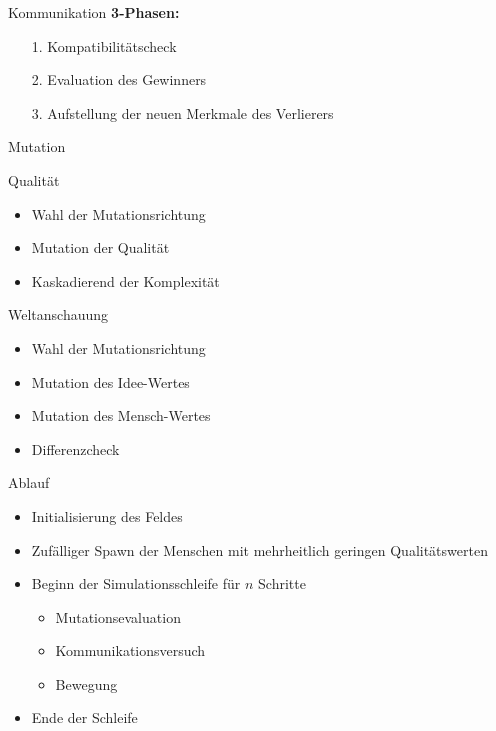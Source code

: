 \begin{frame} {Kommunikation}
	\textbf{3-Phasen:}
	\begin{itemize}
		\item[1.] Kompatibilitätscheck
		\item[2.] Evaluation des Gewinners
		\item[3.] Aufstellung der neuen Merkmale des Verlierers
	\end{itemize}
\end{frame}

\begin{frame}{Mutation}
	\uncover<1-2> {
	\begin{block} {Qualität}
		\begin{itemize}
			\item Wahl der Mutationsrichtung
			\item Mutation der Qualität
	 		\item Kaskadierend der Komplexität
		\end{itemize}
	\end{block}
	}
	 {
	\begin{block} {Weltanschauung}
		\begin{itemize}
			\item Wahl der Mutationsrichtung
			\item Mutation des Idee-Wertes
			\item Mutation des Mensch-Wertes
			\item Differenzcheck
		\end{itemize}
	\end{block}
	}
\end{frame}

\begin{frame} {Ablauf}
	\begin{itemize}
		\item Initialisierung des Feldes
		\item Zufälliger Spawn der Menschen mit mehrheitlich geringen Qualitätswerten
		\item Beginn der Simulationsschleife für \(n\) Schritte
		\begin{itemize}
			\item Mutationsevaluation
			\item Kommunikationsversuch
			\item Bewegung
		\end{itemize}
		\item Ende der Schleife
	\end{itemize}
\end{frame}
